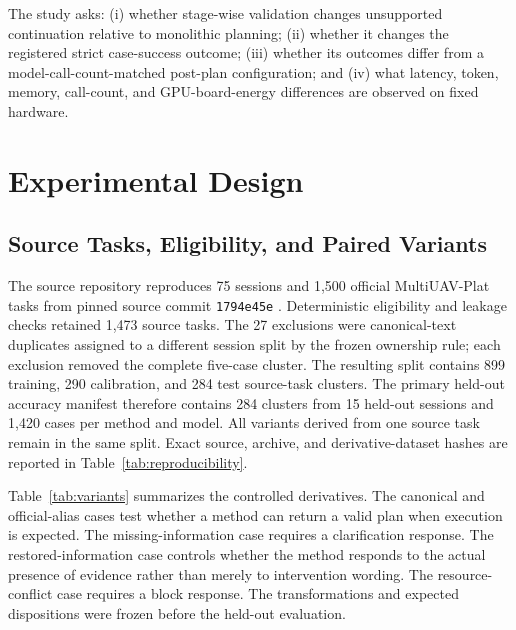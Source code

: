 \documentclass[conference]{IEEEtran}
\begin{document}
The study asks: (i) whether stage-wise validation changes unsupported
continuation relative to monolithic planning; (ii) whether it changes the
registered strict case-success outcome; (iii) whether its outcomes differ from
a model-call-count-matched post-plan configuration; and (iv) what latency,
token, memory, call-count, and GPU-board-energy differences are observed on
fixed hardware.

\section{Experimental Design}

\subsection{Source Tasks, Eligibility, and Paired Variants}

The source repository reproduces 75 sessions and 1,500 official
MultiUAV-Plat tasks from pinned source commit \texttt{1794e45e}
\cite{multiuav_plat}. Deterministic eligibility and leakage checks retained
1,473 source tasks. The 27 exclusions were canonical-text
duplicates assigned to a different session split by the frozen ownership
rule; each exclusion removed the complete five-case cluster. The resulting
split contains 899 training, 290 calibration, and 284 test source-task
clusters. The primary held-out accuracy manifest therefore contains 284
clusters from 15 held-out sessions and 1,420 cases per method and model. All
variants derived from one source task remain in the same split. Exact source,
archive, and derivative-dataset hashes are reported in
Table~\ref{tab:reproducibility}.

Table~\ref{tab:variants} summarizes the controlled derivatives. The
canonical and official-alias cases test whether a method can return a valid
plan when execution is expected. The missing-information case requires a
clarification response. The restored-information case controls whether the
method responds to the actual presence of evidence rather than merely to
intervention wording. The resource-conflict case requires a block response.
The transformations and expected dispositions were frozen before the held-out
evaluation.
\end{document}
